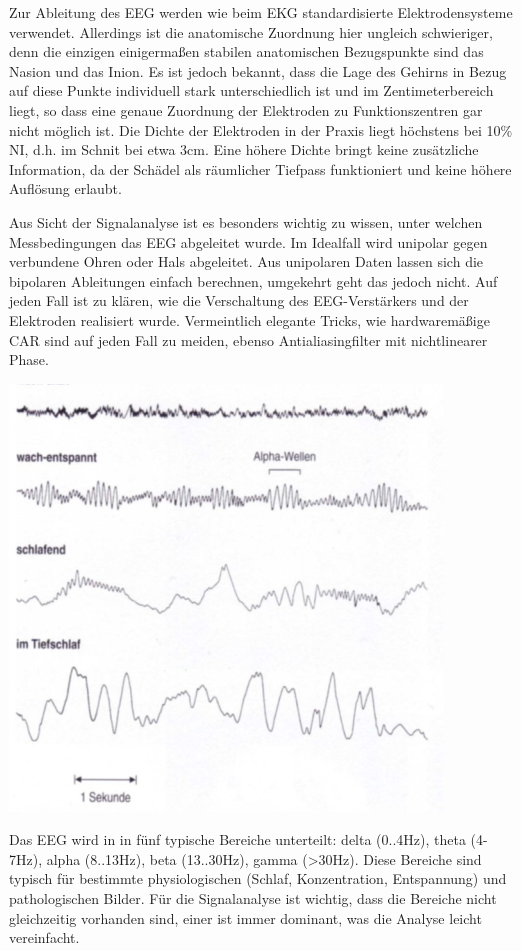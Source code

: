 \documentclass[a4paper]{article}
\begin{document}
\begin{multicols}{3}
  Zur Ableitung des EEG werden wie beim EKG standardisierte
  Elektrodensysteme verwendet. Allerdings ist die anatomische Zuordnung
  hier ungleich schwieriger, denn die einzigen einigermaßen stabilen
  anatomischen Bezugspunkte sind das Nasion und das Inion. Es ist jedoch
  bekannt, dass die Lage des Gehirns in Bezug auf diese Punkte individuell
  stark unterschiedlich ist und im Zentimeterbereich liegt, so dass eine
  genaue Zuordnung der Elektroden zu Funktionszentren gar nicht möglich
  ist. Die Dichte der Elektroden in der Praxis liegt höchstens bei 10\%
  NI, d.h. im Schnit bei etwa 3cm. Eine höhere Dichte bringt keine
  zusätzliche Information, da der Schädel als räumlicher Tiefpass
  funktioniert und keine höhere Auflösung erlaubt.

  Aus Sicht der Signalanalyse ist es besonders wichtig zu wissen, unter
  welchen Messbedingungen das EEG abgeleitet wurde. Im Idealfall wird
  unipolar gegen verbundene Ohren oder Hals abgeleitet. Aus unipolaren
  Daten lassen sich die bipolaren Ableitungen einfach berechnen, umgekehrt
  geht das jedoch nicht. Auf jeden Fall ist zu klären, wie die
  Verschaltung des EEG-Verstärkers und der Elektroden realisiert wurde.
  Vermeintlich elegante Tricks, wie hardwaremäßige CAR sind auf jeden Fall
  zu meiden, ebenso Antialiasingfilter mit nichtlinearer Phase.

  \includegraphics[width=.5\linewidth]{Assets/Biosignalverarbeitung-gehirn-eeg.png}

  Das EEG wird in in fünf typische Bereiche unterteilt: delta (0..4Hz),
  theta (4-7Hz), alpha (8..13Hz), beta (13..30Hz), gamma
  (\textgreater30Hz). Diese Bereiche sind typisch für bestimmte
  physiologischen (Schlaf, Konzentration, Entspannung) und pathologischen
  Bilder. Für die Signalanalyse ist wichtig, dass die Bereiche nicht
  gleichzeitig vorhanden sind, einer ist immer dominant, was die Analyse
  leicht vereinfacht.


\end{multicols}
\end{document}
